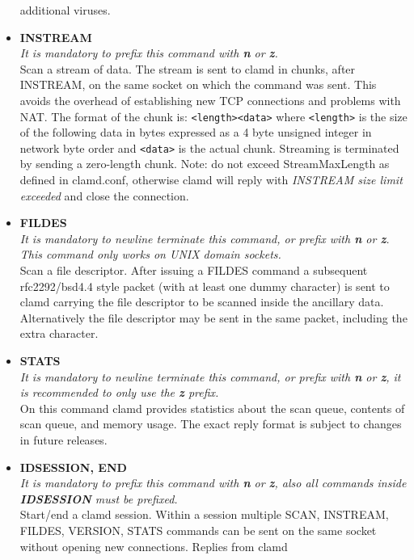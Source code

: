 \documentclass[a4paper,titlepage,12pt]{article}
\begin{document}
\begin{itemize}
            additional viruses.
	\item \textbf{INSTREAM}\\
	    \emph{It is mandatory to prefix this command with \textbf{n} or
	    \textbf{z}.}\\
	    Scan a stream of data. The stream is sent to clamd in chunks,
	    after INSTREAM, on the same socket on which the command
	    was sent. This avoids the overhead of establishing new TCP
	    connections and problems with NAT. The format of the chunk is:
	    \verb+<length><data>+ where \verb+<length>+ is the size of the
	    following data in bytes expressed as a 4 byte unsigned integer in
	    network byte order and \verb+<data>+ is the actual chunk. Streaming
	    is terminated by sending a zero-length chunk. Note: do not exceed
	    StreamMaxLength as defined in clamd.conf, otherwise clamd will
	    reply with \emph{INSTREAM size limit exceeded} and close the
	    connection.
	\item \textbf{FILDES}\\
	    \emph{It is mandatory to newline terminate this command, or prefix
	    with \textbf{n} or \textbf{z}. This command only works on UNIX
	    domain sockets.}\\
	    Scan a file descriptor. After issuing a FILDES command a subsequent
	    rfc2292/bsd4.4 style packet (with at least one dummy character) is
	    sent to clamd carrying the file descriptor to be scanned inside the
	    ancillary data. Alternatively the file descriptor may be sent in
	    the same packet, including the extra character.
	\item \textbf{STATS}\\
	    \emph{It is mandatory to newline terminate this command, or prefix
	    with \textbf{n} or \textbf{z}, it is recommended to only use the
	    \textbf{z} prefix.}\\
	    On this command clamd provides statistics about the scan queue,
	    contents of scan queue, and memory usage. The exact reply format is
	    subject to changes in future releases.
	\item \textbf{IDSESSION, END}\\
	    \emph{It is mandatory to prefix this command with \textbf{n} or
	    \textbf{z}, also all commands inside \textbf{IDSESSION} must be
	    prefixed.}\\
	    Start/end a clamd session. Within a session multiple
	    SCAN, INSTREAM, FILDES, VERSION, STATS commands can be sent on the
	    same socket without opening new connections. Replies from clamd

\end{itemize}
\end{document}
